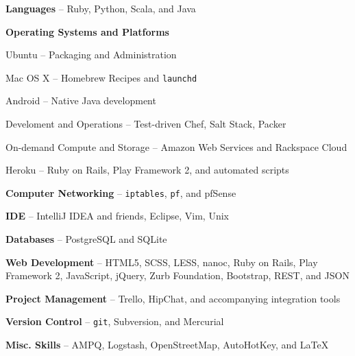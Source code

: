 \documentclass[10pt, letter]{article}
\newcommand{\reference}[4]{
\subsection*{#1 | {\footnotesize{#2}}}
#3 -- \href{mailto:#4}{\texttt{#4}}
}
\newenvironment{packed_item}{
\begin{itemize}
  \setlength{\itemsep}{1pt}
  \setlength{\parskip}{0pt}
  \setlength{\parsep}{0pt}
}{\end{itemize}}
\begin{document}
\begin{multicols}{2}
\begin{packed_item}
    \item \textbf{Languages} -- Ruby, Python, Scala, and Java
    \item \textbf{Operating Systems and Platforms}
        \begin{packed_item}
            \item Ubuntu -- Packaging and Administration
            \item Mac OS X -- Homebrew Recipes and \texttt{launchd}
            \item Android -- Native Java development
            \item Develoment and Operations -- Test-driven Chef, Salt Stack, Packer
            \item On-demand Compute and Storage -- Amazon Web Services and Rackspace Cloud
            \item Heroku -- Ruby on Rails, Play Framework 2, and automated scripts
        \end{packed_item}
    \item \textbf{Computer Networking} -- \texttt{iptables}, \texttt{pf}, and pfSense
    \item \textbf{IDE} -- IntelliJ IDEA and friends, Eclipse, Vim, Unix
    \item \textbf{Databases} -- PostgreSQL and SQLite
    \item \textbf{Web Development} -- HTML5, SCSS, LESS, nanoc, Ruby on Rails, Play Framework 2, JavaScript, jQuery, Zurb Foundation, Bootstrap, REST, and JSON
    \item \textbf{Project Management} -- Trello, HipChat, and accompanying integration tools
    \item \textbf{Version Control} -- \texttt{git}, Subversion, and Mercurial
    \item \textbf{Misc. Skills} -- AMPQ, Logstash, OpenStreetMap, AutoHotKey, and \LaTeX
\end{packed_item}








\end{multicols}
\end{document}
